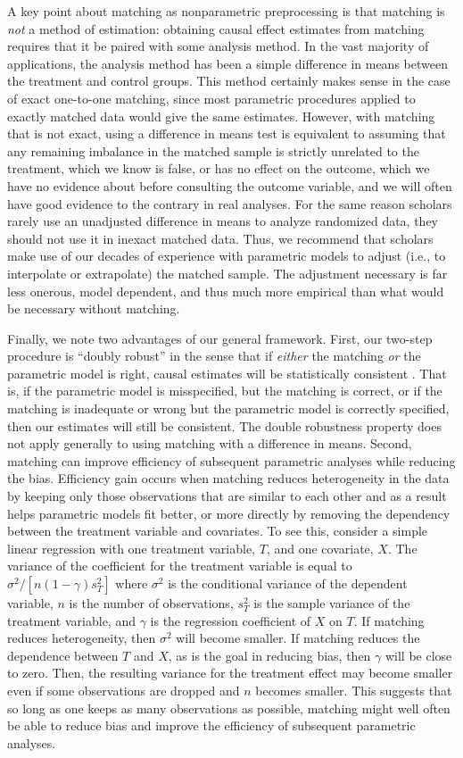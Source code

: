 \documentclass[11pt,titlepage]{article}
\begin{document}
A key point about matching as nonparametric preprocessing is that
matching is \emph{not} a method of estimation: obtaining causal effect
estimates from matching requires that it be paired with some analysis
method.  In the vast majority of applications, the analysis method has
been a simple difference in means between the treatment and control
groups.  This method certainly makes sense in the case of exact
one-to-one matching, since most parametric procedures applied to
exactly matched data would give the same estimates.  However, with
matching that is not exact, using a difference in means test is
equivalent to assuming that any remaining imbalance in the matched
sample is strictly unrelated to the treatment, which we know is false,
or has no effect on the outcome, which we have no evidence about
before consulting the outcome variable, and we will often have good
evidence to the contrary in real analyses.  For the same reason
scholars rarely use an unadjusted difference in means to analyze
randomized data, they should not use it in inexact matched data.
Thus, we recommend that scholars make use of our decades of experience
with parametric models to adjust (i.e., to interpolate or extrapolate)
the matched sample.  The adjustment necessary is far less onerous,
model dependent, and thus much more empirical than what would be
necessary without matching.

Finally, we note two advantages of our general framework. First, our
two-step procedure is ``doubly robust'' in the sense that if
\emph{either} the matching \emph{or} the parametric model is right,
causal estimates will be statistically consistent
\citep[see][]{RobRot01}.  That is, if the parametric model is
misspecified, but the matching is correct, or if the matching is
inadequate or wrong but the parametric model is correctly specified,
then our estimates will still be consistent.  The double robustness
property does not apply generally to using matching with a difference
in means.  Second, matching can improve efficiency of subsequent
parametric analyses while reducing the bias. Efficiency gain occurs
when matching reduces heterogeneity in the data by keeping only those
observations that are similar to each other and as a result helps
parametric models fit better, or more directly by removing the
dependency between the treatment variable and covariates.  To see
this, consider a simple linear regression with one treatment variable,
$T$, and one covariate, $X$.  The variance of the coefficient for the
treatment variable is equal to $\sigma^2/[n (1-\gamma) s^2_T]$ where
$\sigma^2$ is the conditional variance of the dependent variable, $n$
is the number of observations, $s^2_T$ is the sample variance of the
treatment variable, and $\gamma$ is the regression coefficient of $X$
on $T$. If matching reduces heterogeneity, then $\sigma^2$ will become
smaller.  If matching reduces the dependence between $T$ and $X$, as
is the goal in reducing bias, then $\gamma$ will be close to zero.
Then, the resulting variance for the treatment effect may become
smaller even if some observations are dropped and $n$ becomes smaller.
This suggests that so long as one keeps as many observations as
possible, matching might well often be able to reduce bias and improve
the efficiency of subsequent parametric analyses.
\end{document}
